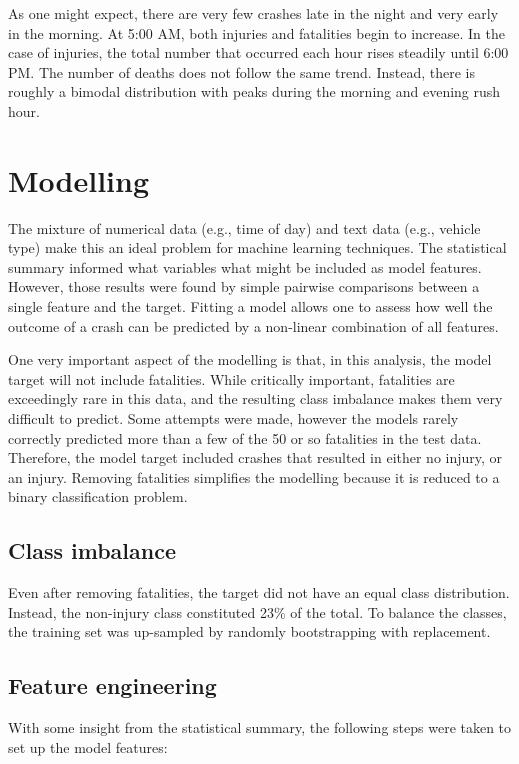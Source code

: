 \documentclass[twocolumn,oneside]{article}
\begin{document}
As one might expect, there are very few crashes late in the night and
very early in the morning.  At 5:00 AM, both injuries and fatalities
begin to increase.  In the case of injuries, the total number that
occurred each hour rises steadily until 6:00 PM.  The number of deaths
does not follow the same trend.  Instead, there is roughly a bimodal
distribution with peaks during the morning and evening rush hour.

\section{Modelling}

The mixture of numerical data (e.g., time of day) and text data (e.g.,
vehicle type) make this an ideal problem for machine learning
techniques.  The statistical summary informed what variables what
might be included as model features.  However, those results were
found by simple pairwise comparisons between a single feature and the
target.  Fitting a model allows one to assess how well the outcome of
a crash can be predicted by a non-linear combination of all features.

One very important aspect of the modelling is that, in this analysis,
the model target will not include fatalities.  While critically
important, fatalities are exceedingly rare in this data, and the
resulting class imbalance makes them very difficult to predict.  Some
attempts were made, however the models rarely correctly predicted more
than a few of the 50 or so fatalities in the test data.  Therefore,
the model target included crashes that resulted in either no injury,
or an injury.  Removing fatalities simplifies the modelling because it
is reduced to a binary classification problem.

\subsection{Class imbalance}

Even after removing fatalities, the target did not have an equal class
distribution.  Instead, the non-injury class constituted 23\% of the
total.  To balance the classes, the training set was up-sampled by
randomly bootstrapping with replacement.

\subsection{Feature engineering}

With some insight from the statistical summary, the following steps were
taken to set up the model features:
\end{document}
